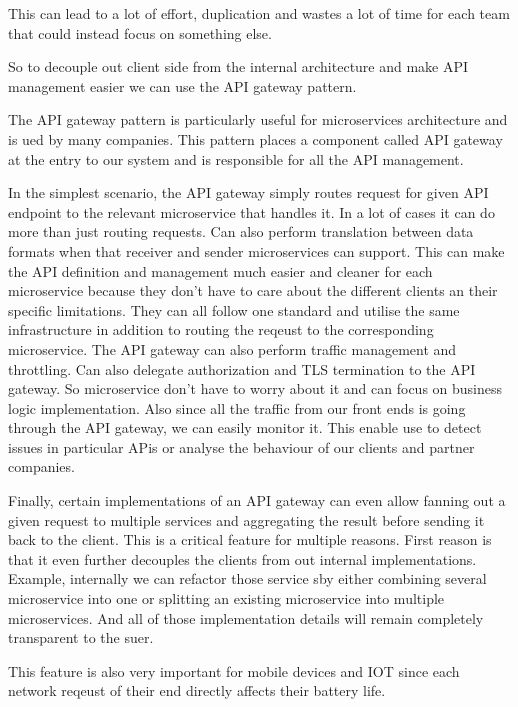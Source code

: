 This can lead to a lot of effort, duplication and wastes a lot of time for each team that could instead focus on something else.

So to decouple out client side from the internal architecture and make API management easier we can use the API gateway pattern.

The API gateway pattern is particularly useful for microservices architecture and is ued by many companies.
This pattern places a component called API gateway at the entry to our system and is responsible for all the API management.

In the simplest scenario, the API gateway simply routes request for given API endpoint to the relevant microservice that handles it.
In a lot of cases it can do more than just routing requests.
Can also perform translation between data formats when that receiver and sender microservices can support.
This can make the API definition and management much easier and cleaner for each microservice because they don't have to care about the different clients an their specific limitations.
They can all follow one standard and utilise the same infrastructure in addition to routing the reqeust to the corresponding microservice.
The API gateway can also perform traffic management and throttling.
Can also delegate authorization and TLS termination to the API gateway.
So microservice don't have to worry about it and can focus on business logic implementation.
Also since all the traffic from our front ends is going through the API gateway, we can easily monitor it.
This enable use to detect issues in particular APis or analyse the behaviour of our clients and partner companies.

Finally, certain implementations of an API gateway can even allow fanning out a given request to multiple services and aggregating the result before sending it back to the client.
This is a critical feature for multiple reasons.
First reason is that it even further decouples the clients from out internal implementations.
Example, internally we can refactor those service sby either combining several microservice into one or splitting an existing microservice into multiple microservices.
And all of those implementation details will remain completely transparent to the suer.

\begin{note}
    This feature is also very important for mobile devices and IOT since each network reqeust of their end directly affects their battery life.
\end{note}

